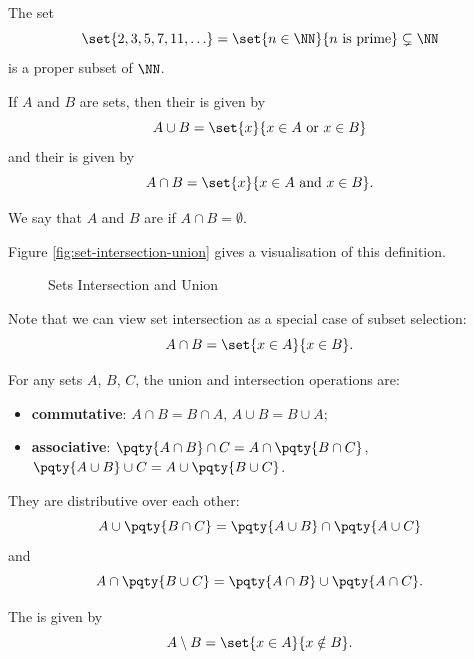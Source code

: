 \begin{example}
    The set
    \[
        \set{2, 3, 5, 7, 11, \ldots} = \set{n \in \NN}{n \text{ is prime}} \subsetneq \NN
    \]
    is a proper subset of \(\NN\).
\end{example}

\begin{definition}
    If \(A\) and \(B\) are sets, then their  is given by
    \[
        A \cup B = \set{x}{x \in A \text{ or } x \in B}
    \]
    and their  is given by
    \[
        A \cap B = \set{x}{x \in A \text{ and } x \in B}.
    \]

    We say that \(A\) and \(B\) are  if \(A \cap B = \emptyset\).
\end{definition}

Figure \autoref{fig:set-intersection-union} gives a visualisation of this definition.

\begin{figure}[ht!]
    \centering
    \caption{Sets Intersection and Union}
    \label{fig:set-intersection-union}
\end{figure}

Note that we can view set intersection as a special case of subset selection:
\[
    A \cap B = \set{x \in A}{x \in B}.
\]

\begin{proposition}
    For any sets \(A\), \(B\), \(C\), the union and intersection operations are:
    \begin{itemize}
        \item \textbf{commutative}: \(A \cap B = B \cap A\), \(A \cup B = B \cup A\);
        \item \textbf{associative}: \(\pqty{A \cap B} \cap C = A \cap \pqty{B \cap C}\), \(\pqty{A \cup B} \cup C = A \cup \pqty{B \cup C}\).
    \end{itemize}

    They are distributive over each other:
    \[
        A \cup \pqty{B \cap C} = \pqty{A \cup B} \cap \pqty{A \cup C}
    \]
    and
    \[
        A \cap \pqty{B \cup C} = \pqty{A \cap B} \cup \pqty{A \cap C}.
    \]
\end{proposition}

\begin{definition}
    The  is given by
    \[
        A \setminus B = \set{x \in A}{x \notin B}.
    \]
\end{definition}

